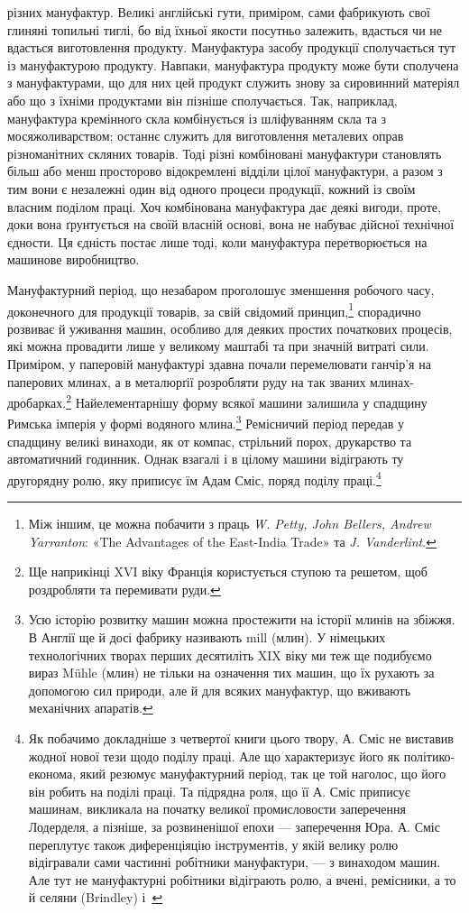 \parcont{}  %
різних мануфактур. Великі англійські гути, приміром, сами
фабрикують свої глиняні топильні тиглі, бо від їхньої якости
посутньо залежить, вдасться чи не вдасться виготовлення продукту.
Мануфактура засобу продукції сполучається тут із мануфактурою
продукту. Навпаки, мануфактура продукту може бути
сполучена з мануфактурами, що для них цей продукт служить
знову за сировинний матеріял або що з їхніми продуктами він
пізніше сполучається. Так, наприклад, мануфактура кремінного
скла комбінується із шліфуванням скла та з мосяжоливарством;
останнє служить для виготовлення металевих оправ різноманітних
скляних товарів. Тоді різні комбіновані мануфактури
становлять більш або менш просторово відокремлені відділи цілої
мануфактури, а разом з тим вони є незалежні один від одного
процеси продукції, кожний із своїм власним поділом праці. Хоч
комбінована мануфактура дає деякі вигоди, проте, доки вона
ґрунтується на своїй власній основі, вона не набуває дійсної
технічної єдности. Ця єдність постає лише тоді, коли мануфактура
перетворюється на машинове виробництво.

Мануфактурний період, що незабаром проголошує зменшення
робочого часу, доконечного для продукції товарів, за свій свідомий
принцип,\footnote{
Між іншим, це можна побачити з праць \emph{W. Petty, John Bellers,
Andrew Yarranton}: «The Advantages of the East-India Trade» та \emph{J. Vanderlint}.
} спорадично розвиває й уживання машин, особливо
для деяких простих початкових процесів, які можна провадити
лише у великому маштабі та при значній витраті сили. Приміром,
у паперовій мануфактурі здавна почали перемелювати ганчір’я
на паперових млинах, а в металюрґії розробляти руду на так
званих млинах-дробарках.\footnote{
Ще наприкінці XVI віку Франція користується ступою та решетом,
щоб роздробляти та перемивати руди.
} Найелементарнішу форму всякої
машини залишила у спадщину Римська імперія у формі водяного
млина.\footnote{
Усю історію розвитку машин можна простежити на історії млинів
на збіжжя. В Англії ще й досі фабрику називають mill (млин). У
німецьких технологічних творах перших десятиліть XIX віку ми теж
ще подибуємо вираз Mühle (млин) не тільки на означення тих машин,
що їх рухають за допомогою сил природи, але й для всяких мануфактур,
що вживають механічних апаратів.
} Ремісничий період передав у спадщину великі винаходи,
як от компас, стрільний порох, друкарство та автоматичний
годинник. Однак взагалі і в цілому машини відіграють ту другорядну
ролю, яку приписує їм Адам Сміс, поряд поділу праці.\footnote{
Як побачимо докладніше з четвертої книги цього твору, А. Сміс
не виставив жодної нової тези щодо поділу праці. Але що характеризує
його як політико-економа, який резюмує мануфактурний період, так
це той наголос, що його він робить на поділі праці. Та підрядна роля,
що її А. Сміс приписує машинам, викликала на початку великої промисловости
заперечення Лодерделя, а пізніше, за розвиненішої епохи —
заперечення Юра. А. Сміс переплутує також диференціяцію інструментів,
у якій велику ролю відігравали сами частинні робітники мануфактури,
— з винаходом машин. Але тут не мануфактурні робітники
відіграють ролю, а вчені, ремісники, а то й селяни (Brindley) і~
}
\parbreak{}  %
